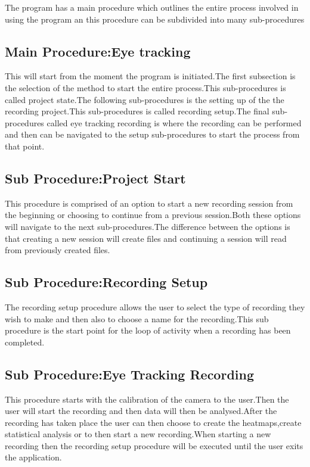The program has a main procedure which outlines the entire process involved in using the program an this procedure can be subdivided into many sub-procedures
\subsection{Main Procedure:Eye tracking}
This will start from the moment the program is initiated.The first subsection is the selection of the method to start the entire process.This sub-procedures is called project state.The following sub-procedures is the setting up of the the recording project.This sub-procedures is called recording setup.The final sub-procedures called eye tracking recording is where the recording can be performed and then can be navigated to the setup sub-procedures to start the process from that point.
\subsection{Sub Procedure:Project Start}
This procedure is comprised of an option to start a new recording session from the beginning or choosing to continue from a previous session.Both these options will navigate to the next sub-procedures.The difference between the options is that creating a new session will create files and continuing a session will read from previously created files. 
\subsection{Sub Procedure:Recording Setup}
The recording setup procedure allows the user to select the type of recording they wish to make and then also to choose a name for the recording.This sub procedure is the start point for the loop of activity when a recording has been completed.
\subsection{Sub Procedure:Eye Tracking Recording}
This procedure starts with the calibration of the camera to the user.Then the user will start the recording and then data will then be analysed.After the recording has taken place the user can then choose to create the heatmaps,create statistical analysis or to then start a new recording.When starting a new recording then the recording setup procedure will be executed until the user exits the application. 